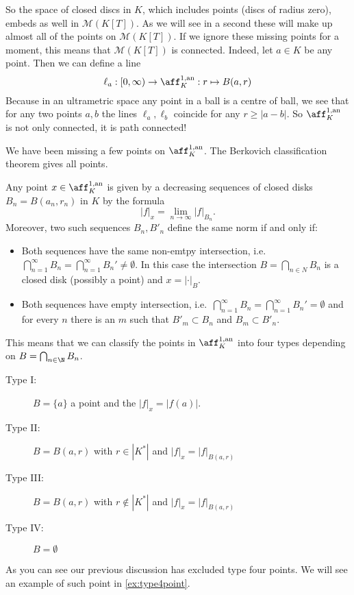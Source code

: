 So the space of closed discs in $K$, which includes points (discs of radius zero), embeds as well in $\mathcal{M} (K[T])$. 
As we will see in a second these will make up almost all of the points on $\mathcal{M} (K[T])$. 
If we ignore these missing points for a moment, this means that $\mathcal{M}(K[T])$ is connected. 
Indeed, let $a \in K$ be any point. Then we can define a line \begin{equation}\label{eq:line_in_A_1}
	\ell_a: [0, \infty) \to  \aff_K^{1, \text{an}}: r\mapsto B(a, r)
\end{equation}
Because in an ultrametric space any point in a ball is a centre of ball, we see that for any two points $a, b$ the lines $\ell_a, \ell_b$ coincide for any $r \ge |a - b|$. 
So $\aff_K^{1,\text{an}}$ is not only connected, it is path connected!

We have been missing a few points on $\aff_K^{1, \text{an}}$. 
The Berkovich classification theorem gives all points. 
\begin{theorem}
	 \label{thm:berkovich_classification}
	Any point $x \in \aff_K^{1,\text{an}}$ is given by a decreasing sequences of closed disks $B_n = B(a_n, r_n)$ in $K$ by the formula \begin{equation}\label{eq:norm_disk_polynomial}
	|f|_x = \lim_{n \to \infty} |f|_{B_n}
	.\end{equation}
	Moreover, two such sequences $B_n, B'_n$ define the same norm if and only if:
	 \begin{itemize}
		\item Both sequences have the same non-emtpy intersection, i.e.\ $\bigcap_{n = 1}^{\infty} B_n = \bigcap_{n = 1}^{\infty} B_n' \ne \emptyset$. 
			In this case the intersection $B = \bigcap_{n \in N} B_n$ is a closed disk (possibly a point) and $x = |\cdot |_B$. 
		\item Both sequences have empty intersection, i.e.\ $\bigcap_{n = 1}^{\infty} B_n = \bigcap_{n = 1}^{\infty} B_n' = \emptyset$  and for every $n$ there is an $m$ such that $B'_m \subset  B_n$  and $B_m \subset  B'_n$.
	\end{itemize}
	This means that we can classify the points in $\aff ^{1,\text{an}}_K$ into four types depending on $B = \bigcap_{n \in \N} B_n$. 
	\begin{description}
		\item[Type I:] $B = \{a\} $ a point and the $|f|_x = |f(a)|$. 
		\item[Type II:] $B = B(a, r)$ with $r \in |K^* |$ and $|f|_x = |f|_{B(a, r)}$
		\item[Type III:] $B = B (a, r)$ with $r \not\in |K^*|$ and $|f|_x = |f|_{B(a, r)}$
		\item[Type IV:] $B = \emptyset$
	\end{description}
\end{theorem}
As you can see our previous discussion has excluded type four points. We will see an example of such point in \cref{ex:type4point}. 

